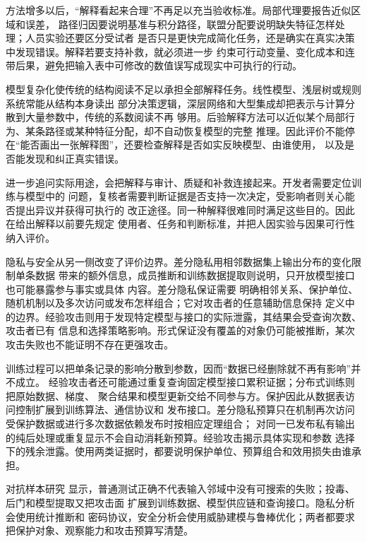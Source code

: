 方法增多以后，“解释看起来合理”不再足以充当验收标准。局部代理要报告近似区域和误差，
路径归因要说明基准与积分路径，联盟分配要说明缺失特征怎样处理；人员实验还要区分受试者
是否只是更快完成简化任务，还是确实在真实决策中发现错误。解释若要支持补救，就必须进一步
约束可行动变量、变化成本和连带后果，避免把输入表中可修改的数值误写成现实中可执行的行动。

模型复杂化使传统的结构阅读不足以承担全部解释任务。线性模型、浅层树或规则系统常能从结构本身读出
部分决策逻辑，深层网络和大型集成却把表示与计算分散到大量参数中，传统的系数阅读不再
够用。后验解释方法可以近似某个局部行为、某条路径或某种特征分配，却不自动恢复模型的完整
推理。因此评价不能停在“能否画出一张解释图”，还要检查解释是否如实反映模型、由谁使用，
以及是否能发现和纠正真实错误。

进一步追问实际用途，会把解释与审计、质疑和补救连接起来。开发者需要定位训练与模型中的
问题，复核者需要判断证据是否支持一次决定，受影响者则关心能否提出异议并获得可执行的
改正途径。同一种解释很难同时满足这些目的。因此在给出解释以前要先规定
使用者、任务和判断标准，并把人因实验与因果可行性纳入评价。

隐私与安全从另一侧改变了评价边界。差分隐私用相邻数据集上输出分布的变化限制单条数据
带来的额外信息，成员推断和训练数据提取则说明，只开放模型接口也可能暴露参与事实或具体
内容。差分隐私保证需要
明确相邻关系、保护单位、随机机制以及多次访问或发布怎样组合；它对攻击者的任意辅助信息保持
定义中的边界。经验攻击则用于发现特定模型与接口的实际泄露，其结果会受查询次数、攻击者已有
信息和选择策略影响。形式保证没有覆盖的对象仍可能被推断，某次攻击失败也不能证明不存在更强攻击。

训练过程可以把单条记录的影响分散到参数，因而“数据已经删除就不再有影响”并不成立。
经验攻击者还可能通过重复查询固定模型接口累积证据；分布式训练则把原始数据、梯度、
聚合结果和模型更新交给不同参与方。保护因此从数据表访问控制扩展到训练算法、通信协议和
发布接口。差分隐私预算只在机制再次访问受保护数据或进行多次数据依赖发布时按相应定理组合；
对同一已发布私有输出的纯后处理或重复显示不会自动消耗新预算。经验攻击揭示具体实现和参数
选择下的残余泄露。使用两类证据时，都要说明保护单位、预算组合和效用损失由谁承担。

对抗样本研究
显示，普通测试正确不代表输入邻域中没有可搜索的失败；投毒、后门和模型提取又把攻击面
扩展到训练数据、模型供应链和查询接口。隐私分析会使用统计推断和
密码协议，安全分析会使用威胁建模与鲁棒优化；两者都要求把保护对象、观察能力和攻击预算写清楚。

